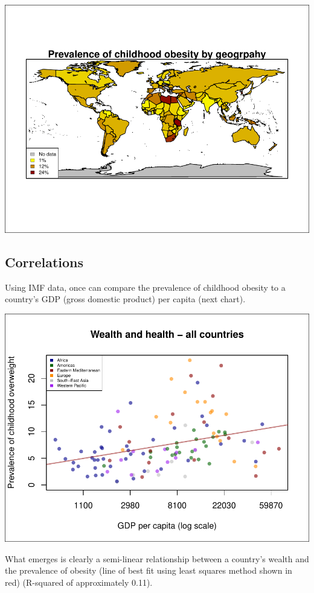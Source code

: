 \documentclass[11pt]{article}
\begin{document}
\begin{multicols}{2}
\begin{center}
\includegraphics{global_variance-007}
\end{center}


\subsection*{Correlations}

Using IMF data, once can compare the prevalence of childhood obesity to a country's GDP (gross domestic product) per capita (next chart).\\

\begin{center}
\includegraphics{global_variance-008}
\end{center}
What emerges is clearly a semi-linear relationship between a country's wealth and the prevalence of obesity (line of best fit using least squares method shown in red) (R-squared of approximately 0.11).  \\


\end{multicols}
\end{document}
